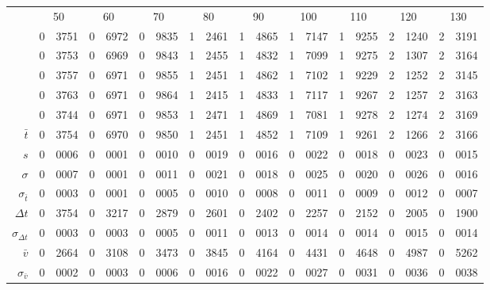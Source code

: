 \begin{tabular}{r *9{r@{.}l}}
 &\multicolumn{2}{c}{50}
&\multicolumn{2}{c}{60}
&\multicolumn{2}{c}{70}
&\multicolumn{2}{c}{80}
&\multicolumn{2}{c}{90}
&\multicolumn{2}{c}{100}
&\multicolumn{2}{c}{110}
&\multicolumn{2}{c}{120}
&\multicolumn{2}{c}{130}\\[3 pt]
  &0&3751 &0&6972 &0&9835 &1&2461 &1&4865 &1&7147 &1&9255 &2&1240 &2&3191\\
  &0&3753 &0&6969 &0&9843 &1&2455 &1&4832 &1&7099 &1&9275 &2&1307 &2&3164\\
  &0&3757 &0&6971 &0&9855 &1&2451 &1&4862 &1&7102 &1&9229 &2&1252 &2&3145\\
  &0&3763 &0&6971 &0&9864 &1&2415 &1&4833 &1&7117 &1&9267 &2&1257 &2&3163\\
  &0&3744 &0&6971 &0&9853 &1&2471 &1&4869 &1&7081 &1&9278 &2&1274 &2&3169\\[3 pt]
$\bar{t}$ &0&3754 &0&6970 &0&9850 &1&2451 &1&4852 &1&7109 &1&9261 &2&1266 &2&3166\\
$s$ &0&0006 &0&0001 &0&0010 &0&0019 &0&0016 &0&0022 &0&0018 &0&0023 &0&0015\\
$\sigma$ &0&0007 &0&0001 &0&0011 &0&0021 &0&0018 &0&0025 &0&0020 &0&0026 &0&0016\\
$\sigma_{\bar{t}}$ &0&0003 &0&0001 &0&0005 &0&0010 &0&0008 &0&0011 &0&0009 &0&0012 &0&0007\\[3 pt]
$\Delta t$ &0&3754 &0&3217 &0&2879 &0&2601 &0&2402 &0&2257 &0&2152 &0&2005 &0&1900\\
$\sigma_{\Delta t}$ &0&0003 &0&0003 &0&0005 &0&0011 &0&0013 &0&0014 &0&0014 &0&0015 &0&0014\\
$\bar{v}$ &0&2664 &0&3108 &0&3473 &0&3845 &0&4164 &0&4431 &0&4648 &0&4987 &0&5262\\
$\sigma_{\bar{v}}$ &0&0002 &0&0003 &0&0006 &0&0016 &0&0022 &0&0027 &0&0031 &0&0036 &0&0038
\end{tabular}